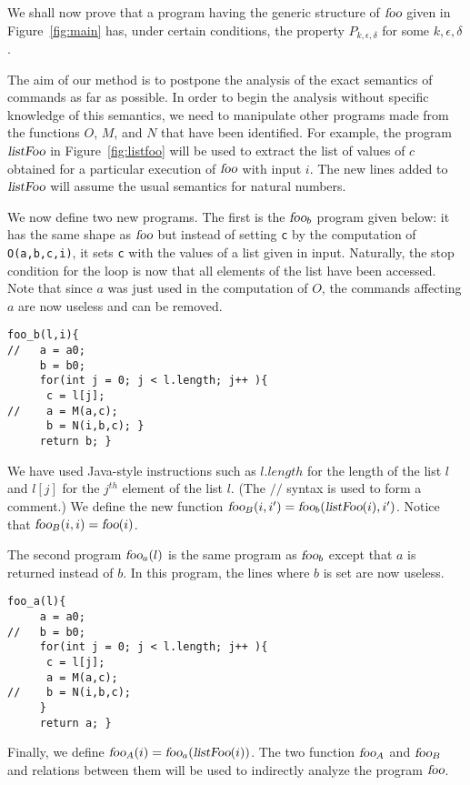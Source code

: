 \documentclass[copyright,creativecommons]{eptcs}
\newcommand{\foo}{\hbox{\sl foo}}
\newcommand{\fooa}{\hbox{\sl foo}_a}
\newcommand{\fooA}{\hbox{\sl foo}_A}
\newcommand{\foob}{\hbox{\sl foo}_b}
\newcommand{\fooB}{\hbox{\sl foo}_B}
\newcommand{\ListFoo}{\hbox{\sl listFoo}}
\begin{document}
We shall now prove that a program having the generic structure of $\foo$
given in Figure~\ref{fig:main} has, under certain conditions, the
property $P_{k,\epsilon,\delta}$ for some $k,\epsilon,\delta$.

The aim of our method is to postpone the analysis of the exact
semantics of commands as far as possible. In order to begin the
analysis without specific knowledge of this semantics, we need to
manipulate other programs made from the functions $O$, $M$, and $N$
that have been identified.  For example, the program $\ListFoo$ in
Figure~\ref{fig:listfoo} will be used to extract the list of values
of $c$ obtained for a particular execution of $\foo$ with input $i$.
The new lines added to $\ListFoo$ will assume the usual semantics for
natural numbers.







We now define two new programs.  The first is the 
$\foob$ program given below: it has the same shape as $\foo$
but instead of setting {\tt c} by the computation of {\tt O(a,b,c,i)}, it
sets {\tt c} with the values of a list given in input. Naturally, the stop
condition for the loop is now that all elements of the list have been
accessed. Note that since $a$ was just used in the computation of $O$,
the commands affecting $a$ are now useless and can be removed. 
\begin{lstlisting}[language=pscode]
foo_b(l,i){
//   a = a0;
     b = b0;
     for(int j = 0; j < l.length; j++ ){
	  c = l[j];
//	  a = M(a,c);
	  b = N(i,b,c); }
     return b; }
\end{lstlisting}
We have used Java-style instructions such as $l.\mathit{length}$ for the
length of the list $l$ and $l[j]$ for the $j^{th}$ element of the list
$l$.  (The $//$ syntax is used to form a comment.)  We define the new
function $\fooB(i,i') = \foob(\ListFoo(i),i')$.  
Notice that $\fooB(i,i)=\foo(i)$. 

The second program $\fooa(l)$ is the same program as $\foob$ except
that $a$ is returned instead of $b$. In this program, the lines where
$b$ is set are now useless. 
\begin{lstlisting}[language=pscode]
foo_a(l){
     a = a0;
//   b = b0;
     for(int j = 0; j < l.length; j++ ){
	  c = l[j];
	  a = M(a,c);
//	  b = N(i,b,c);
     }
     return a; }
\end{lstlisting}
Finally, we define $\fooA(i) = \fooa(\ListFoo(i))$. 
The two function $\fooA$ and $\fooB$ and relations between them will
be used to indirectly analyze the program $\foo$.
\end{document}
